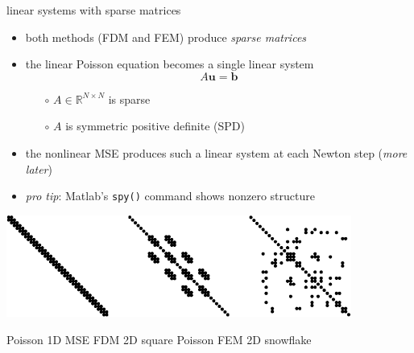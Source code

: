 \documentclass[hide notes,intlimits,usenames,dvipsnames]{beamer}
\newcommand{\RR}{\mathbb{R}}
\newcommand{\bb}{\mathbf{b}}
\newcommand{\bu}{\mathbf{u}}
\begin{document}
\begin{frame}{linear systems with sparse matrices}
\begin{itemize}
\item both methods (FDM and FEM) produce \emph{sparse matrices}
\item the linear Poisson equation becomes a single linear system
    $$A \bu = \bb$$
    \vspace{-4mm}
	\begin{itemize}
	\item[$\circ$] $A\in\RR^{N\times N}$ is sparse
	\item[$\circ$] $A$ is symmetric positive definite (SPD)
	\end{itemize}
\item the nonlinear MSE produces such a linear system at each Newton step (\emph{more later})
\item \emph{pro tip}: Matlab's \texttt{spy()} command shows nonzero structure
\end{itemize}

\bigskip
\begin{center}
\includegraphics[width=0.85\textwidth]{figs/spythree}

\scriptsize
\qquad Poisson 1D \qquad\qquad\quad MSE FDM 2D square \qquad\quad Poisson FEM 2D snowflake

\end{center}
\end{frame}
\end{document}
